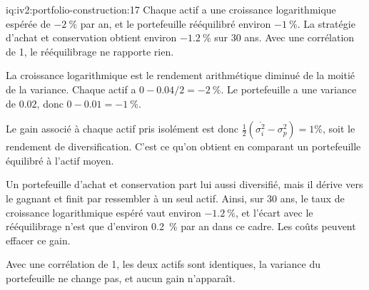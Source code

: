 \begin{solution}{iq:iv2:portfolio-construction:17}
Chaque actif a une croissance logarithmique espérée de $-2~\%$ par an, et le portefeuille rééquilibré environ $-1~\%$. La stratégie d'achat et conservation obtient environ $-1.2~\%$ sur 30 ans. Avec une corrélation de 1, le rééquilibrage ne rapporte rien.

La croissance logarithmique est le rendement arithmétique diminué de la moitié de la variance. Chaque actif a $0 - 0.04/2 = -2~\%$. Le portefeuille a une variance de $0.02$, donc $0 - 0.01 = -1~\%$.

Le gain associé à chaque actif pris isolément est donc $\tfrac12(\overline{\sigma_i^2} - \sigma_p^2) = 1\%$, soit le rendement de diversification. C'est ce qu'on obtient en comparant un portefeuille équilibré à l'actif moyen.

Un portefeuille d'achat et conservation part lui aussi diversifié, mais il dérive vers le gagnant et finit par ressembler à un seul actif. Ainsi, sur 30 ans, le taux de croissance logarithmique espéré vaut environ $-1.2~\%$, et l'écart avec le rééquilibrage n'est que d'environ 0.2~\% par an dans ce cadre. Les coûts peuvent effacer ce gain.

Avec une corrélation de 1, les deux actifs sont identiques, la variance du portefeuille ne change pas, et aucun gain n'apparaît.

\end{solution}

